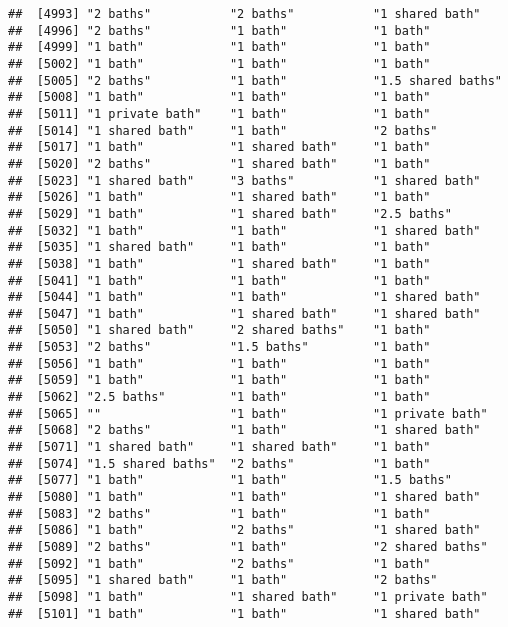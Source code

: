\documentclass[
]{article}
\begin{document}
\begin{verbatim}
##  [4993] "2 baths"           "2 baths"           "1 shared bath"    
##  [4996] "2 baths"           "1 bath"            "1 bath"           
##  [4999] "1 bath"            "1 bath"            "1 bath"           
##  [5002] "1 bath"            "1 bath"            "1 bath"           
##  [5005] "2 baths"           "1 bath"            "1.5 shared baths" 
##  [5008] "1 bath"            "1 bath"            "1 bath"           
##  [5011] "1 private bath"    "1 bath"            "1 bath"           
##  [5014] "1 shared bath"     "1 bath"            "2 baths"          
##  [5017] "1 bath"            "1 shared bath"     "1 bath"           
##  [5020] "2 baths"           "1 shared bath"     "1 bath"           
##  [5023] "1 shared bath"     "3 baths"           "1 shared bath"    
##  [5026] "1 bath"            "1 shared bath"     "1 bath"           
##  [5029] "1 bath"            "1 shared bath"     "2.5 baths"        
##  [5032] "1 bath"            "1 bath"            "1 shared bath"    
##  [5035] "1 shared bath"     "1 bath"            "1 bath"           
##  [5038] "1 bath"            "1 shared bath"     "1 bath"           
##  [5041] "1 bath"            "1 bath"            "1 bath"           
##  [5044] "1 bath"            "1 bath"            "1 shared bath"    
##  [5047] "1 bath"            "1 shared bath"     "1 shared bath"    
##  [5050] "1 shared bath"     "2 shared baths"    "1 bath"           
##  [5053] "2 baths"           "1.5 baths"         "1 bath"           
##  [5056] "1 bath"            "1 bath"            "1 bath"           
##  [5059] "1 bath"            "1 bath"            "1 bath"           
##  [5062] "2.5 baths"         "1 bath"            "1 bath"           
##  [5065] ""                  "1 bath"            "1 private bath"   
##  [5068] "2 baths"           "1 bath"            "1 shared bath"    
##  [5071] "1 shared bath"     "1 shared bath"     "1 bath"           
##  [5074] "1.5 shared baths"  "2 baths"           "1 bath"           
##  [5077] "1 bath"            "1 bath"            "1.5 baths"        
##  [5080] "1 bath"            "1 bath"            "1 shared bath"    
##  [5083] "2 baths"           "1 bath"            "1 bath"           
##  [5086] "1 bath"            "2 baths"           "1 shared bath"    
##  [5089] "2 baths"           "1 bath"            "2 shared baths"   
##  [5092] "1 bath"            "2 baths"           "1 bath"           
##  [5095] "1 shared bath"     "1 bath"            "2 baths"          
##  [5098] "1 bath"            "1 shared bath"     "1 private bath"   
##  [5101] "1 bath"            "1 bath"            "1 shared bath"    

\end{verbatim}
\end{document}
